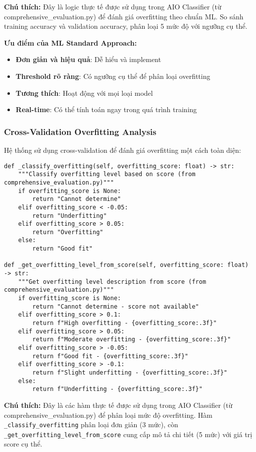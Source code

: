 \textbf{Chú thích:} Đây là logic thực tế được sử dụng trong AIO Classifier (từ comprehensive\_evaluation.py) để đánh giá overfitting theo chuẩn ML. So sánh training accuracy và validation accuracy, phân loại 5 mức độ với ngưỡng cụ thể.

\textbf{Ưu điểm của ML Standard Approach:}
\begin{itemize}
    \item \textbf{Đơn giản và hiệu quả}: Dễ hiểu và implement
    \item \textbf{Threshold rõ ràng}: Có ngưỡng cụ thể để phân loại overfitting
    \item \textbf{Tương thích}: Hoạt động với mọi loại model
    \item \textbf{Real-time}: Có thể tính toán ngay trong quá trình training
\end{itemize}

\subsubsection{Cross-Validation Overfitting Analysis}

Hệ thống sử dụng cross-validation để đánh giá overfitting một cách toàn diện:

\begin{verbatim}
def _classify_overfitting(self, overfitting_score: float) -> str:
    """Classify overfitting level based on score (from comprehensive_evaluation.py)"""
    if overfitting_score is None:
        return "Cannot determine"
    elif overfitting_score < -0.05:
        return "Underfitting"
    elif overfitting_score > 0.05:
        return "Overfitting"
    else:
        return "Good fit"

def _get_overfitting_level_from_score(self, overfitting_score: float) -> str:
    """Get overfitting level description from score (from comprehensive_evaluation.py)"""
    if overfitting_score is None:
        return "Cannot determine - score not available"
    elif overfitting_score > 0.1:
        return f"High overfitting - {overfitting_score:.3f}"
    elif overfitting_score > 0.05:
        return f"Moderate overfitting - {overfitting_score:.3f}"
    elif overfitting_score > -0.05:
        return f"Good fit - {overfitting_score:.3f}"
    elif overfitting_score > -0.1:
        return f"Slight underfitting - {overfitting_score:.3f}"
    else:
        return f"Underfitting - {overfitting_score:.3f}"
\end{verbatim}

\textbf{Chú thích:} Đây là các hàm thực tế được sử dụng trong AIO Classifier (từ comprehensive\_evaluation.py) để phân loại mức độ overfitting. Hàm \texttt{\_classify\_overfitting} phân loại đơn giản (3 mức), còn \texttt{\_get\_overfitting\_level\_from\_score} cung cấp mô tả chi tiết (5 mức) với giá trị score cụ thể.

